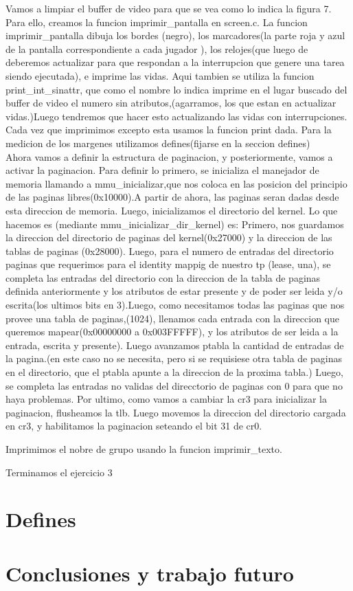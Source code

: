 \documentclass[a4paper]{article}
\begin{document}
Vamos a limpiar el buffer de video para que se vea como lo indica la figura 7. Para ello, creamos la funcion imprimir_pantalla en screen.c.
	La funcion imprimir_pantalla dibuja los bordes (negro), los marcadores(la parte roja y azul de la pantalla correspondiente a cada jugador ), los relojes(que luego de deberemos actualizar para que respondan a la interrupcion que genere una tarea siendo ejecutada), e imprime las vidas. Aqui tambien se utiliza la funcion print_int_sinattr, que como el nombre lo indica imprime en el lugar buscado del buffer de video el numero sin atributos,(agarramos, los que estan en actualizar vidas.)Luego tendremos que hacer esto actualizando las vidas con interrupciones. Cada vez que imprimimos excepto esta usamos la funcion print dada. Para la medicion de los margenes utilizamos defines(fijarse en la seccion defines)
	\\
	Ahora vamos a  definir la estructura de paginacion, y posteriormente, vamos a activar la paginacion.
	Para definir lo primero, se inicializa el manejador de memoria llamando a mmu_inicializar,que nos coloca en las posicion del principio de las paginas libres(0x10000).A partir de ahora, las paginas seran dadas desde esta direccion de memoria. Luego, inicializamos el directorio del kernel. 
	Lo que hacemos es (mediante  mmu_inicializar_dir_kernel)  es:
	Primero, nos guardamos la direccion del directorio de paginas del kernel(0x27000) y la direccion de las tablas de paginas (0x28000).
	Luego, para el numero de entradas del directorio paginas que requerimos para el identity mappig de nuestro tp (lease, una), se completa las entradas del directorio con la direccion de la tabla de paginas definida anteriormente y los atributos de estar presente y de poder ser leida y/o escrita(los ultimos bits en 3).Luego, como necesitamos todas las paginas que nos provee una tabla de paginas,(1024), llenamos cada entrada con la direccion que queremos mapear(0x00000000 a 0x003FFFFF), y  los atributos de ser leida a la entrada, escrita y presente). Luego avanzamos ptabla la cantidad de entradas de la pagina.(en este caso no se necesita, pero si se requisiese otra tabla de paginas en el directorio, que el ptabla apunte a la direccion de la proxima tabla.) Luego, se completa las entradas no validas del direcctorio de paginas con 0 para que no haya problemas.
	Por ultimo, como vamos a cambiar la cr3 para inicializar la paginacion, flusheamos la tlb.
	Luego movemos la direccion del directorio cargada en cr3, y habilitamos la paginacion seteando el bit 31 de cr0.

	Imprimimos el nobre de grupo usando la funcion imprimir_texto.
	 
	Terminamos el ejercicio 3





\section{Defines}

\section{Conclusiones y trabajo futuro}
\end{document}
